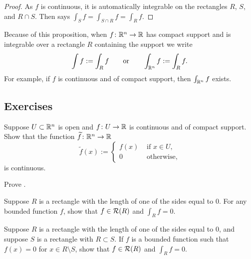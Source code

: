 \begin{proof}
As $f$ is continuous, it is automatically integrable on the rectangles $R$, $S$, and $R
\cap S$.
Then  says
$\int_S f = \int_{S \cap R} f = \int_R f$.
\end{proof}

Because of this proposition, when $f \colon {\mathbb{R}}^n \to {\mathbb{R}}$ has compact support
and is integrable over a rectangle $R$ containing the support we write
\begin{equation*}
\int f := \int_R f \qquad \text{or} \qquad 
\int_{{\mathbb{R}}^n} f := \int_R f .
\end{equation*}
For example, if $f$ is continuous and of compact support, then
$\int_{{\mathbb{R}}^n} f$ exists.

\subsection{Exercises}

\begin{exercise} \label{exercise:contcompactsupportRn}
Suppose $U \subset {\mathbb{R}}^n$ is open and $f \colon U \to {\mathbb{R}}$ is continuous and
of compact support.  Show that the function $\widetilde{f} \colon {\mathbb{R}}^n \to {\mathbb{R}}$
\begin{equation*}
\widetilde{f}(x) :=
\begin{cases}
f(x) & \text{ if $x \in U$,} \\
0 & \text{ otherwise,}
\end{cases}
\end{equation*}
is continuous.
\end{exercise}


\begin{exercise}
Prove .
\end{exercise}


\begin{exercise}
Suppose $R$ is a rectangle with the length of one of the sides equal to 0.
For any bounded function $f$, show that $f \in {\mathcal{R}}(R)$ and $\int_R f = 0$.
\end{exercise}

\begin{exercise} \label{mv:zerosiderectangle}
Suppose $R$ is a rectangle with the length of one of the sides equal to 0,
and suppose $S$ is a rectangle with $R \subset S$.  If $f$
is a bounded function such that $f(x) = 0$ for $x \in R \setminus S$, show
that $f \in {\mathcal{R}}(R)$ and $\int_R f = 0$.
\end{exercise}

